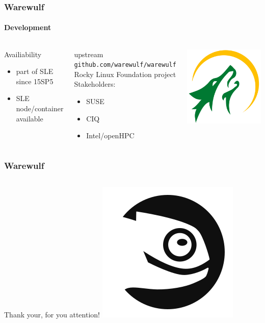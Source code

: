 \documentclass[aspectratio=169]{beamer}
\begin{document}
\begin{frame}[fragile]
\frametitle{Warewulf}
\framesubtitle{Development}
\begin{columns}
\begin{block}{Availiability}
  \begin{itemize}
    \item part of SLE since 15SP5
    \item SLE node/container available
  \end{itemize}
\end{block}
\begin{block}{upstream}
\texttt{github.com/warewulf/warewulf} \\
Rocky Linux Foundation project\\
Stakeholders:
\begin{itemize}
  \item SUSE
  \item CIQ
  \item Intel/openHPC
\end{itemize}
\end{block}
\includegraphics[width=.8\linewidth]{warewulf-logo}
\end{columns}
\end{frame}
\begin{frame}[fragile]
\frametitle{Warewulf}
\begin{columns}
Thank your, for you attention!
\includegraphics[width=.8\linewidth]{button-monochrome}
\end{columns}
\end{frame}
\end{document}
